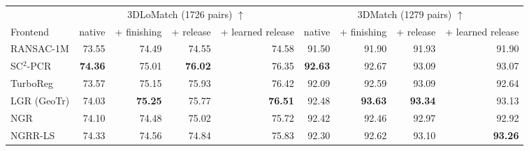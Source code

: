 \begin{tabular}{lrrrrrrrr}
\toprule
 & \multicolumn{4}{c}{3DLoMatch (1726 pairs) $\uparrow$} & \multicolumn{4}{c}{3DMatch (1279 pairs) $\uparrow$} \\
\cmidrule(lr){2-5}\cmidrule(lr){6-9}
Frontend & native & + finishing & + release & + learned release & native & + finishing & + release & + learned release \\
\midrule
RANSAC-1M & 73.55 & 74.49 & 74.55 & 74.58 & 91.50 & 91.90 & 91.93 & 91.90 \\
SC$^2$-PCR & \textbf{74.36} & 75.01 & \textbf{76.02} & 76.35 & \textbf{92.63} & 92.67 & 93.09 & 93.07 \\
TurboReg & 73.57 & 75.15 & 75.93 & 76.42 & 92.09 & 92.59 & 93.09 & 92.64 \\
LGR (GeoTr) & 74.03 & \textbf{75.25} & 75.77 & \textbf{76.51} & 92.48 & \textbf{93.63} & \textbf{93.34} & 93.13 \\
NGR & 74.10 & 74.48 & 75.02 & 75.72 & 92.42 & 92.46 & 92.97 & 92.92 \\
NGRR-LS & 74.33 & 74.56 & 74.84 & 75.83 & 92.30 & 92.62 & 93.10 & \textbf{93.26} \\
\bottomrule
\end{tabular}
